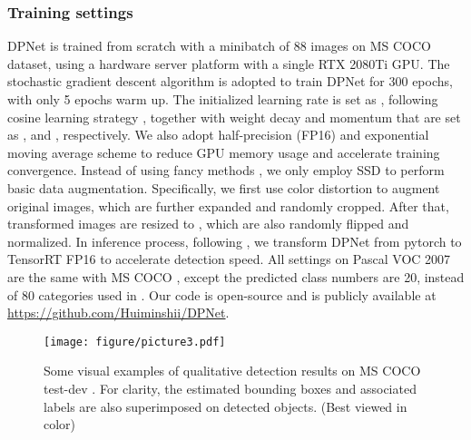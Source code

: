 \documentclass[lettersize,journal]{IEEEtran}
\begin{document}
\subsubsection{Training settings}
DPNet is trained from scratch with a minibatch of 88 images on MS COCO dataset\cite{lin2014microsoft}, using a hardware server platform with a single RTX 2080Ti GPU. The stochastic gradient descent algorithm \cite{bottou2010large} is adopted to train DPNet for 300 epochs, with only 5 epochs warm up. The initialized learning rate is set as , following cosine learning strategy \cite{loshchilov2016sgdr}, together with weight decay and momentum that are set as , and , respectively. We also adopt half-precision (FP16) \cite{ge2021yolox} and exponential moving average scheme \cite{micikevicius2017mixed} to reduce GPU memory usage and accelerate training convergence. Instead of using fancy methods \cite{bochkovskiy2020yolov4,zhang2017mixup}, we only employ SSD \cite{liu2016ssd} to perform basic data augmentation. Specifically, we first use color distortion to augment original images, which are further expanded and randomly cropped. After that, transformed images are resized to , which are also randomly flipped and normalized. In inference process, following \cite{redmon2018yolov3,wang2021scaled}, we transform DPNet from pytorch to TensorRT FP16 to accelerate detection speed. All settings on Pascal VOC 2007 \cite{everingham2010pascal} are the same with MS COCO \cite{lin2014microsoft}, except the predicted class numbers are 20, instead of 80 categories used in \cite{lin2014microsoft}. Our code is open-source and is publicly available at \url{https://github.com/Huiminshii/DPNet}.

\begin{figure*}[t!] 
	\centering 
	\texttt{[image: figure/picture3.pdf]} 
	\caption{Some visual examples of qualitative detection results on MS COCO test-dev \cite{lin2014microsoft}. For clarity, the estimated bounding boxes and associated labels are also superimposed on detected objects. (Best viewed in color)} 
	\label{Fig:Vis} 
\end{figure*}
\end{document}

